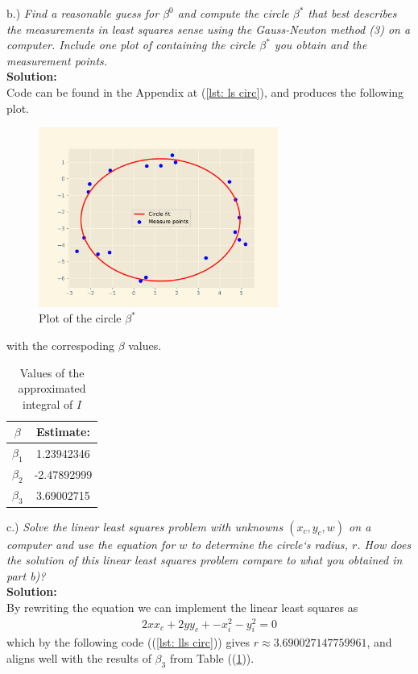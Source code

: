 \documentclass[12pt,
               a4paper,
               article,
               oneside,
               english,oldfontcommands]{memoir}
\let\oldref\ref
\renewcommand{\ref}[1]{(\oldref{#1})}
\newcommand{\spaze}{\vspace{4mm}\\}
\begin{document}
b.) \emph{Find a reasonable guess for $\beta^{0}$ and compute the circle $\beta^{*}$ that best describes the measurements in least squares sense using the Gauss-Newton method (3) on a computer. Include one plot of containing the circle $\beta^{*}$ you obtain and the measurement points.} \spaze 
\textbf{Solution:} \spaze
Code can be found in the Appendix at \ref{lst: ls circ}, and produces the following plot. 
\begin{figure}[H]
\centering 
\includegraphics[width=0.7\textwidth]{circle_fit.pdf}
\caption{Plot of the circle $\beta^{*}$}
\end{figure}
with the correspoding $\beta$ values.
\begin{table}[H] 
  \begin{center} 
    \begin{tabular}{c c} 
      $\beta$ & Estimate:\\
      \hline
     	 $\beta_{1}$ & 1.23942346\\
     	   $\beta_{2} $ & -2.47892999 \\
     	      $\beta_{3} $ & 3.69002715\\
      \hline 
    \end{tabular}
     \caption{Values of the approximated integral of $I$}
       \label{tab:beta-fit}
  \end{center}
\end{table}
c.) \emph{Solve the linear least squares problem with unknowns $(x_c, y_c, w)$ on a computer and use the equation for $w$ to determine the circle`s radius, $r$. How does the solution of this linear least squares problem compare to what you obtained in part b)?}\spaze 
\textbf{Solution:}\spaze 
By rewriting the equation we can implement the linear least squares as 
\begin{align*}
2xx_c + 2yy_c + -x_{i}^2 - y_{i}^2 = 0
\end{align*}
which by the following code (\ref{lst: lls circ}) gives $r \approx 3.690027147759961$, and aligns well with the results of $\beta_3$ from Table (\ref{tab:beta-fit}).
\end{document}

